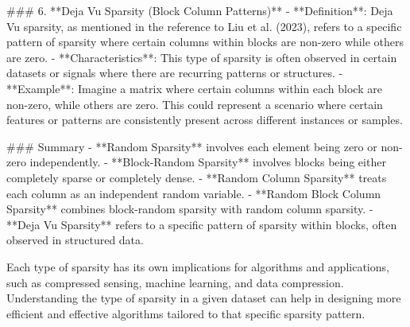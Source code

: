 ### 6. **Deja Vu Sparsity (Block Column Patterns)**
- **Definition**: Deja Vu sparsity, as mentioned in the reference to Liu et al. (2023), refers to a specific pattern of sparsity where certain columns within blocks are non-zero while others are zero.
- **Characteristics**: This type of sparsity is often observed in certain datasets or signals where there are recurring patterns or structures.
- **Example**: Imagine a matrix where certain columns within each block are non-zero, while others are zero. This could represent a scenario where certain features or patterns are consistently present across different instances or samples.

### Summary
- **Random Sparsity** involves each element being zero or non-zero independently.
- **Block-Random Sparsity** involves blocks being either completely sparse or completely dense.
- **Random Column Sparsity** treats each column as an independent random variable.
- **Random Block Column Sparsity** combines block-random sparsity with random column sparsity.
- **Deja Vu Sparsity** refers to a specific pattern of sparsity within blocks, often observed in structured data.

Each type of sparsity has its own implications for algorithms and applications, such as compressed sensing, machine learning, and data compression. Understanding the type of sparsity in a given dataset can help in designing more efficient and effective algorithms tailored to that specific sparsity pattern.